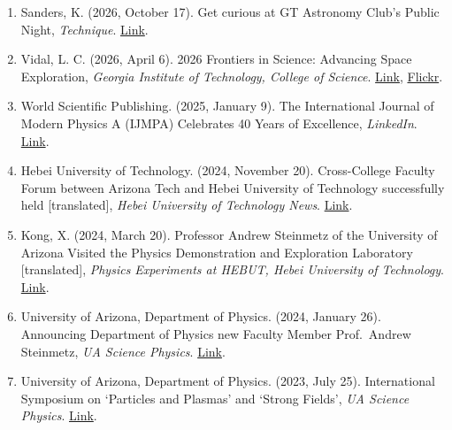 \documentclass[11pt]{article}
\begin{document}
\begin{enumerate}[leftmargin=*,nosep]
    \item Sanders, K. (2026, October 17). Get curious at GT Astronomy Club's Public Night, \textit{Technique}. \href{https://nique.net/life/get-curious-at-gt-astronomy-clubs-public-night-1792276226255}{Link}.
    \item Vidal, L. C. (2026, April 6). 2026 Frontiers in Science: Advancing Space Exploration, \textit{Georgia Institute of Technology, College of Science}. \href{https://physics.gatech.edu/news/2026-frontiers-science-advancing-space-exploration-0}{Link}, \href{https://www.flickr.com/photos/gtsciences/albums/72177720332868366/}{Flickr}.
    \item World Scientific Publishing. (2025, January 9). The International Journal of Modern Physics A (IJMPA) Celebrates 40 Years of Excellence, \textit{LinkedIn}. \href{https://www.linkedin.com/posts/world-scientific-publishing_the-international-journal-of-modern-physics-activity-7282999555967610880-SJ78}{Link}.
    \item Hebei University of Technology. (2024, November 20). Cross-College Faculty Forum between Arizona Tech and Hebei University of Technology successfully held [translated], \textit{Hebei University of Technology News}. \href{https://web.archive.org/web/20250628230434/https://hatech.hebut.edu.cn/xw/62ff3dcc665b453898ec92841d45e0ce.htm}{Link}.
    \item Kong, X. (2024, March 20). Professor Andrew Steinmetz of the University of Arizona Visited the Physics Demonstration and Exploration Laboratory [translated], \textit{Physics Experiments at HEBUT, Hebei University of Technology}. \href{https://web.archive.org/web/20250629152037/https://mp.weixin.qq.com/s?__biz=Mzg4Njg3NjQyMw==&mid=2247484302&idx=1&sn=273f88bc0332d9a34a9fdbee01b196b3&chksm=cf93b3e6f8e43af0b75b832801bbe9e684d258f00c3671e7e625bfccde7c74a387ef9e5a9926&mpshare=1&scene=24&srcid=0320Wt3iZMGOxbLpRBZg9nYA}{Link}.
    \item University of Arizona, Department of Physics. (2024, January 26). Announcing Department of Physics new Faculty Member Prof.~Andrew Steinmetz, \textit{UA Science Physics}. \href{https://w3.physics.arizona.edu/news/announcing-department-physics-new-faculty-member-prof-andrew-steinmetz}{Link}.
    \item University of Arizona, Department of Physics. (2023, July 25). International Symposium on `Particles and Plasmas' and `Strong Fields', \textit{UA Science Physics}. \href{https://w3.physics.arizona.edu/news/international-symposium-particles-and-plasmas-and-strong-fields}{Link}.

\end{enumerate}
\end{document}
